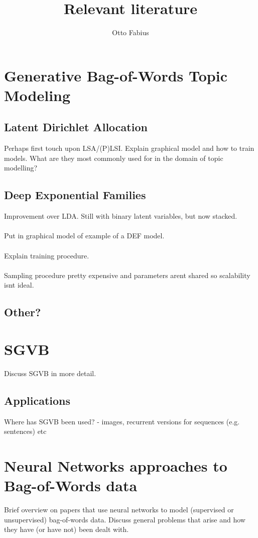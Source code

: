 \documentclass{article}
\author{Otto Fabius}
\title{Relevant literature}
\begin{document}
\maketitle


\section{Generative Bag-of-Words Topic Modeling}
\subsection{Latent Dirichlet Allocation}
Perhaps first touch upon LSA/(P)LSI.  Explain graphical model and how to train models. What are they most commonly used for in the domain of topic modelling?
\subsection{Deep Exponential Families}
Improvement over LDA. Still with binary latent variables, but now stacked. \\ \\
Put in graphical model of example of a DEF model. \\ \\
Explain training procedure. \\ \\
Sampling procedure pretty expensive and  parameters arent shared so scalability isnt ideal.
\subsection{Other?}
\section{SGVB}
Discuss SGVB in more detail.
\subsection{Applications}
Where has SGVB been used? - images, recurrent versions for sequences (e.g. sentences) etc
\section{Neural Networks approaches to Bag-of-Words data}
Brief overview on papers that use neural networks to model (supervised or unsupervised) bag-of-words data. Discuss general problems that arise and how they have (or have not) been dealt with.
\end{document}
